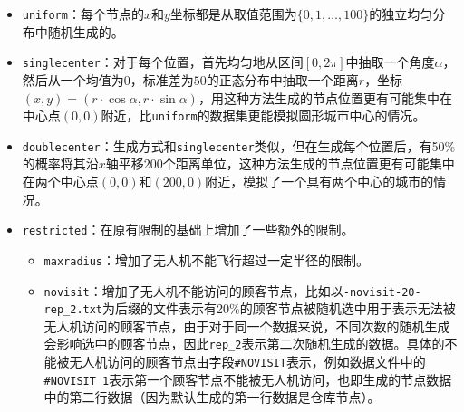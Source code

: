 \begin{itemize}
    \item \texttt{uniform}：每个节点的$x$和$y$坐标都是从取值范围为$\{0,1,\dots,100\}$的独立均匀分布中随机生成的。
    \item \texttt{singlecenter}：对于每个位置，首先均匀地从区间$[0,2\pi]$中抽取一个角度$\alpha$，然后从一个均值为$0$，标准差为$50$的正态分布中抽取一个距离$r$，坐标$(x,y)=(r\cdot \cos \alpha,r\cdot \sin\alpha)$，用这种方法生成的节点位置更有可能集中在中心点$(0,0)$附近，比\texttt{uniform}的数据集更能模拟圆形城市中心的情况。
    \item \texttt{doublecenter}：生成方式和\texttt{singlecenter}类似，但在生成每个位置后，有50\%的概率将其沿$x$轴平移$200$个距离单位，这种方法生成的节点位置更有可能集中在两个中心点$(0,0)$和$(200,0)$附近，模拟了一个具有两个中心的城市的情况。
    \item \texttt{restricted}：在原有限制的基础上增加了一些额外的限制。
    \begin{itemize}
        \item \texttt{maxradius}：增加了无人机不能飞行超过一定半径的限制。
        \item \texttt{novisit}：增加了无人机不能访问的顾客节点，比如以\texttt{-novisit-20-rep\_2.txt}为后缀的文件表示有20\%的顾客节点被随机选中用于表示无法被无人机访问的顾客节点，由于对于同一个数据来说，不同次数的随机生成会影响选中的顾客节点，因此\texttt{rep\_2}表示第二次随机生成的数据。具体的不能被无人机访问的顾客节点由字段\texttt{\#NOVISIT}表示，例如数据文件中的\texttt{\#NOVISIT 1}表示第一个顾客节点不能被无人机访问，也即生成的节点数据中的第二行数据（因为默认生成的第一行数据是仓库节点）。
    \end{itemize}
\end{itemize}

